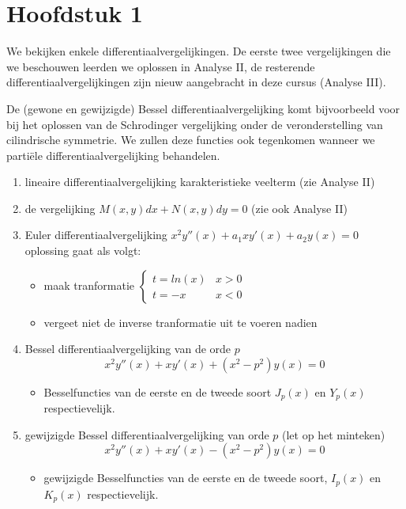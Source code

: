 \documentclass[../../master_thesis/4_written_text/main/main.tex]{subfiles}
\begin{document}
\section{Hoofdstuk 1}
We bekijken enkele differentiaalvergelijkingen. De eerste twee vergelijkingen die we beschouwen leerden we oplossen in Analyse II, de resterende differentiaalvergelijkingen zijn nieuw aangebracht in deze cursus (Analyse III). 

De (gewone en gewijzigde) Bessel differentiaalvergelijking komt bijvoorbeeld voor bij het oplossen van de Schrodinger vergelijking onder de veronderstelling van cilindrische symmetrie. We zullen deze functies ook tegenkomen wanneer we partiële differentiaalvergelijking behandelen.


\begin{enumerate}
\item lineaire differentiaalvergelijking \hfill karakteristieke veelterm (zie Analyse II)

\item de vergelijking $M(x,y)dx +  N(x,y)dy = 0$ \hfill
(zie ook Analyse II)

\item Euler differentiaalvergelijking $x^2y''(x) + a_1xy'(x) + a_2y(x) = 0$ \hfill oplossing gaat als volgt:
\begin{itemize}
\item maak tranformatie $\begin{cases} t=ln(x) & x>0\\ t=-x  & x<0 \end{cases}$
\item vergeet niet de inverse tranformatie uit te voeren nadien
\end{itemize}

\item Bessel differentiaalvergelijking van de orde $p$ 
\begin{equation}
x^2y''(x) + xy'(x) + (x^2-p^2)y(x) = 0
\end{equation}
\begin{itemize}
\item Besselfuncties van de eerste en de tweede soort $J_p(x)$ en $Y_p(x)$ respectievelijk.
\end{itemize}

\item gewijzigde Bessel differentiaalvergelijking van orde $p$ (let op het minteken)
\begin{equation}
x^2y''(x) + xy'(x) - (x^2-p^2)y(x) = 0
\end{equation} 
\begin{itemize}
\item gewijzigde Besselfuncties van de eerste en de tweede soort, $I_p(x)$ en $K_p(x)$ respectievelijk.
\end{itemize}

\end{enumerate}
\end{document}
